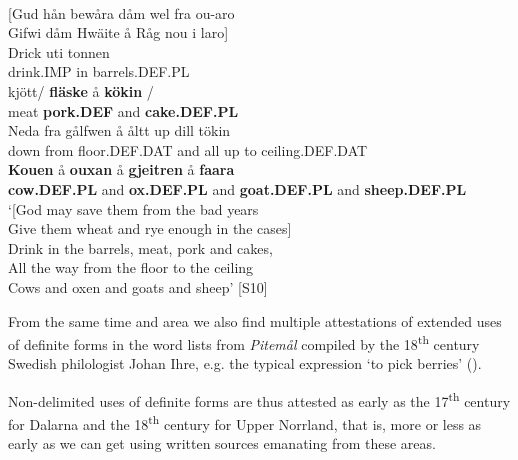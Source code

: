 \ea \label{} 
\\
{}[Gud hån bewåra dåm wel fra ou-aro\\
Gifwi dåm Hwäite å Råg nou i laro]\\
\gll Drick  uti  tonnen\\
drink.IMP  in  barrels.DEF.PL\\
\gll kjött/  \textbf{fläske}  å  \textbf{kökin}  /\\
meat  \textbf{pork.DEF} and  \textbf{cake.DEF.PL} \\
\gll Neda  fra  gålfwen  å  åltt  up  dill  tökin\\
down  from  floor.DEF.DAT  and  all  up  to  ceiling.DEF.DAT\\
\gll \textbf{Kouen} å  \textbf{ouxan} å  \textbf{gjeitren} å  \textbf{faara} \\
\textbf{cow.DEF.PL} and  \textbf{ox.DEF.PL} and  \textbf{goat.DEF.PL} and  \textbf{sheep.DEF.PL} \\
\glt ‘[God may save them from the bad years\\
Give them wheat and rye enough in the cases]\\
Drink in the barrels, meat, pork and cakes,\\
All the way from the floor to the ceiling\\
Cows and oxen and goats and sheep’ [S10]

\z

From the same time and area we also find multiple attestations of extended uses of definite forms in the word lists from \textit{Pitemål} compiled by the 18\textsuperscript{th} century Swedish philologist Johan Ihre, e.g. the typical expression ‘to pick berries’ (\citet{Reinhammar2002}).


Non-delimited uses of definite forms are thus attested as early as the 17\textsuperscript{th} century for Dalarna and the 18\textsuperscript{th} century for Upper Norrland, that is, more or less as early as we can get using written sources emanating from these areas. 


